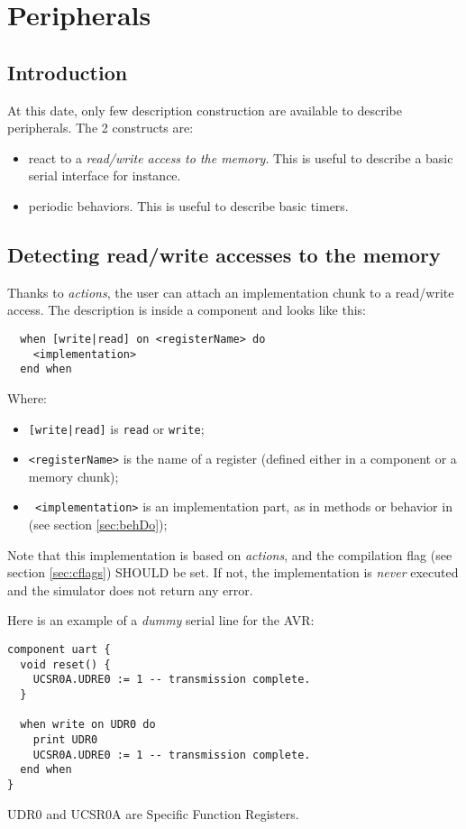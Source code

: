 
\chapter{Peripherals}
\label{chap:peripherals}
\section{Introduction}
At this date, only few description construction are available to describe peripherals. The 2 constructs are:
\begin{itemize}
\item react to a \emph{read/write access to the memory}. This is useful to describe a basic serial interface for instance.
\item periodic behaviors. This is useful to describe basic timers.
\end{itemize}

\section{Detecting read/write accesses to the memory}
\label{sec:whenReadWrite}
Thanks to \emph{actions}, the user can attach an implementation chunk to a read/write access. The description is inside a component and looks like this:
\begin{lstlisting}
  when [write|read] on <registerName> do
    <implementation>
  end when
\end{lstlisting}
Where:
\begin{itemize}
\item \texttt{[write|read]} is \texttt{read} or \texttt{write};
\item \texttt{<registerName>} is the name of a register (defined either in a component or a memory chunk);
\item\texttt{ <implementation>} is an implementation part, as in methods or behavior in \Blocdo (see section \ref{sec:behDo});
\end{itemize}

Note that this implementation is based on \emph{actions}, and the compilation flag (see section \ref{sec:cflags}) SHOULD be set. If not, the implementation is \emph{never} executed and the simulator does not return any error.

Here is an example of a \emph{dummy} serial line for the AVR:
\begin{lstlisting}
component uart {
  void reset() {
    UCSR0A.UDRE0 := 1 -- transmission complete.
  }

  when write on UDR0 do
    print UDR0
    UCSR0A.UDRE0 := 1 -- transmission complete.
  end when
}
\end{lstlisting}
UDR0 and UCSR0A are Specific Function Registers.

